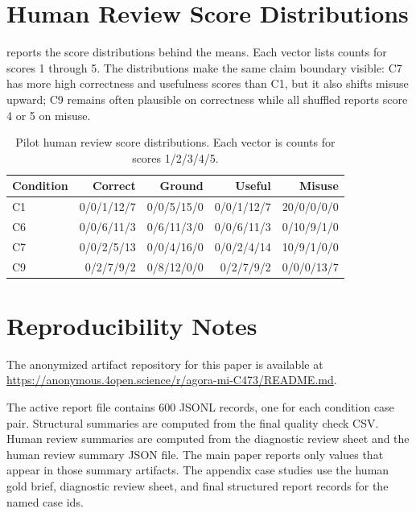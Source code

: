 \documentclass{article}
\begin{document}
\section{Human Review Score Distributions}

 reports the score distributions behind the means. Each vector lists counts for scores 1 through 5. The distributions make the same claim boundary visible: C7 has more high correctness and usefulness scores than C1, but it also shifts misuse upward; C9 remains often plausible on correctness while all shuffled reports score 4 or 5 on misuse.

\begin{table}[h]
    \centering
    \caption{Pilot human review score distributions. Each vector is counts for scores 1/2/3/4/5.}
    \label{tab:appendix-score-distributions}
    \scriptsize
    \setlength{\tabcolsep}{3pt}
    \begin{tabular}{@{}lrrrr@{}}
        \toprule
        Condition & Correct & Ground & Useful & Misuse \\
        \midrule
        C1 & 0/0/1/12/7 & 0/0/5/15/0 & 0/0/1/12/7 & 20/0/0/0/0 \\
        C6 & 0/0/6/11/3 & 0/6/11/3/0 & 0/0/6/11/3 & 0/10/9/1/0 \\
        C7 & 0/0/2/5/13 & 0/0/4/16/0 & 0/0/2/4/14 & 10/9/1/0/0 \\
        C9 & 0/2/7/9/2 & 0/8/12/0/0 & 0/2/7/9/2 & 0/0/0/13/7 \\
        \bottomrule
    \end{tabular}
\end{table}

\section{Reproducibility Notes}

The anonymized artifact repository for this paper is available at \url{https://anonymous.4open.science/r/agora-mi-C473/README.md}.

The active report file contains 600 JSONL records, one for each condition case pair. Structural summaries are computed from the final quality check CSV. Human review summaries are computed from the diagnostic review sheet and the human review summary JSON file. The main paper reports only values that appear in those summary artifacts. The appendix case studies use the human gold brief, diagnostic review sheet, and final structured report records for the named case ids.
\end{document}
